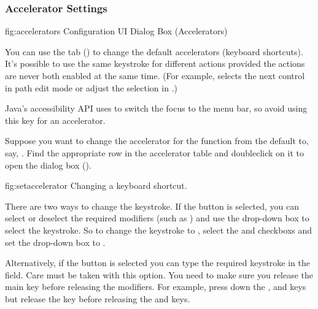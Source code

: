
\subsubsection{Accelerator Settings}\label{sec:accelerators}


\FloatFig
  {fig:accelerators}
  {}
  {Configuration UI Dialog Box (Accelerators)}

You can use the  tab
() to change the default accelerators
(keyboard shortcuts). It's possible to use the same keystroke for
different actions provided the actions are never both enabled at the
same time. (For example, 
selects the next control in path edit mode or adjust the selection
in \selectmode.)

\begin{information}
Java's accessibility API uses  to switch
the focus to the menu bar, so avoid using this key for an
accelerator.
\end{information}

Suppose you want to change the accelerator for the 
function from the default  to, say,
. Find the appropriate row in
the accelerator table and \gls{doubleclick} on it to open the
 dialog box
().

\FloatFig
  {fig:setaccelerator}
  {}
  {Changing a keyboard shortcut.}

There are two ways to change the
keystroke. If the 
button is selected, you can select or deselect the required
modifiers (such as ) and
use the drop-down box to select the keystroke. So to change the
keystroke to , select the
 and
 \glspl{checkbox} and set the drop-down
box to .

Alternatively, if the  button
is selected you can type the required keystroke in the
 field. Care must be
taken with this option. You need to make sure you release the main
key before releasing the modifiers. For example, press down the
,  and  keys
but release the  key before releasing the
 and  keys. 

